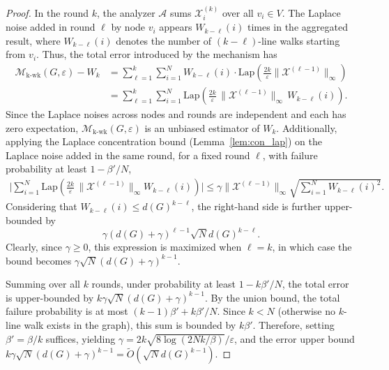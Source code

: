 \begin{proof}
In the round $k$, the analyzer $\mathcal{A}$ sums $\mathcal{X}^{(k)}_i$ over all $v_i \in V$. 
The Laplace noise added in round $\ell$ by node $v_i$ appears $W_{k-\ell}(i)$ times in the aggregated result, 
where $W_{k-\ell}(i)$ denotes the number of $(k-\ell)$-line walks starting from $v_i$. 
Thus, the total error introduced by the mechanism has
\begin{align*}
 \mathcal{M}_{\mathrm{k\text{-}wk}}(G,\varepsilon) - {W}_k
  &= \sum_{\ell=1}^{k} \sum_{i=1}^N 
  W_{k-\ell}(i) \cdot \mathrm{Lap}(\frac{2k}{\varepsilon} \|\mathcal{X}^{(\ell-1)}\|_\infty)\\
 &=\sum_{\ell=1}^{k} 
 \sum_{i=1}^N  
 \mathrm{Lap}(\frac{2k}{\varepsilon} \,
 \|\mathcal{X}^{(\ell-1)}\|_\infty \, W_{k-\ell}(i)).  
\end{align*}
Since the Laplace noises across nodes and rounds are independent and each has zero expectation, $\mathcal{M}_{\mathrm{k\text{-}wk}}(G,\varepsilon)$ is an unbiased estimator of $W_k$. 
Additionally, applying the Laplace concentration bound (Lemma~\ref{lem:con_lap}) on the Laplace noise added in the same round, for a fixed round $\ell$, with failure probability at least $1-\beta'/N$,
\begin{align*}
   \bigg| \sum_{i=1}^N  
 \mathrm{Lap}(\frac{2k}{\varepsilon} \, \|\mathcal{X}^{(\ell-1)}\|_\infty
 W_{k-\ell}(i)
 )
 \bigg|
    \leq 
    \gamma \|\mathcal{X}^{(\ell-1)}\|_\infty
     \sqrt{\sum_{i=1}^N W_{k-\ell}(i)^2}.
\end{align*}
Considering that $W_{k-\ell}(i) \leq d(G)^{k-\ell}$, the right-hand side is further upper-bounded by
\begin{equation*}
    \gamma (d(G) +\gamma)^{\ell-1} \sqrt{N} d(G)^{k-\ell}.
\end{equation*} 
Clearly, since $\gamma\geq0$, this expression is maximized when $\ell = k$, in which case the bound becomes 
$\gamma \sqrt{N}(d(G) + \gamma)^{k - 1}$.



Summing over all $k$ rounds, under probability at least $1 - k\beta'/N$, the total error is upper-bounded by $k\gamma \sqrt{N} (d(G) +\gamma)^{k-1}$.
By the union bound, the total failure probability is at most $(k{-}1)\beta' + k\beta'/N$. 
Since $k < N$ (otherwise no $k$-line walk exists in the graph), this sum is bounded by $k\beta'$. 
Therefore, setting $\beta' = \beta/k$ suffices, yielding $\gamma = 2k\sqrt{8\log(2Nk/\beta)}/\varepsilon$, and the error upper bound $k\gamma \sqrt{N} (d(G) +\gamma)^{k-1} = \tilde{O}(\sqrt{N}d(G)^{k-1})$.
\end{proof}



